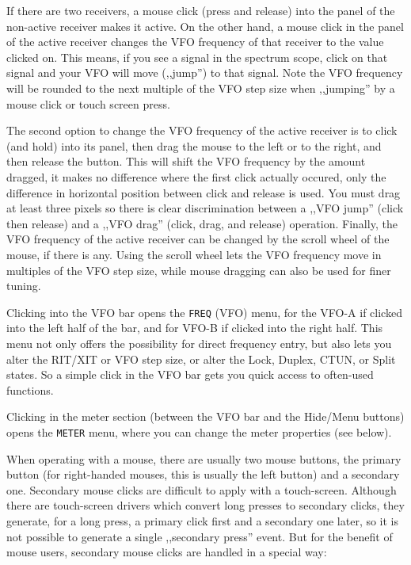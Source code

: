 \documentclass[12pt]{book}
\begin{document}
If there are two receivers, a mouse click (press and release) into
the panel of the non-active receiver makes it active. On the other
hand, a mouse click in the panel of the active receiver changes
the VFO frequency of that receiver to the value clicked on.
This means, if you see a signal in the spectrum scope, click
on that signal and your VFO will move (,,jump'') to that signal.
Note the VFO frequency will be  rounded to the next multiple of
the VFO step size when ,,jumping'' by a mouse  click or
touch screen press.

The second option to change the VFO frequency of the active receiver
is to click (and hold) into its panel, then drag the mouse to the left
or to the right, and then release the button. This will shift the
VFO frequency by the amount dragged, it makes no difference 
where the first click actually occured, only the difference
in horizontal position between click and release is used. You must
drag at least three pixels so there is clear discrimination between
a ,,VFO jump'' (click then release) and a ,,VFO drag'' (click, drag,
and release) operation. Finally, the VFO frequency of the active
receiver can be changed by the scroll wheel of the mouse, if there
is any. Using the scroll wheel lets the VFO frequency move in multiples
of the VFO step size, while mouse dragging can also be used for
finer tuning.

Clicking into the VFO bar opens the \texttt{FREQ} (VFO) menu,
for the VFO-A if clicked into the left half of the bar, and for
VFO-B if clicked into the right half. This menu not only offers
the possibility for direct frequency entry, but also lets you 
alter the RIT/XIT or VFO step size, or alter the Lock, Duplex,
CTUN, or Split states. So a simple click in the VFO bar 
gets you quick access to often-used functions.

Clicking in the meter section (between the VFO bar and the
Hide/Menu buttons) opens the \texttt{METER} menu, where
you can change the meter properties (see below).

When operating with a mouse, there are usually two mouse buttons,
the primary button (for right-handed mouses, this is usually
the left button) and a secondary one. Secondary mouse clicks
are difficult to apply with a touch-screen. Although there are
touch-screen drivers which convert long presses to secondary clicks,
they generate, for a long press, a primary click first and a
secondary one later, so it is not possible to generate a
single ,,secondary press'' event. But for the benefit of
mouse users, secondary mouse clicks are handled in a special way:
\end{document}
